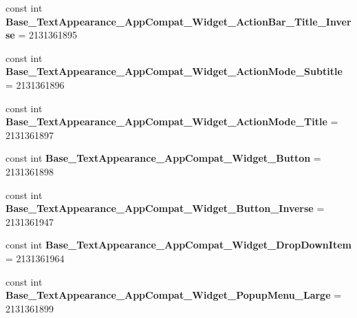 \begin{DoxyCompactItemize}
\item 
\mbox{\label{class_pinned_app_1_1_droid_1_1_resource_1_1_style_ab4b9c350aec81147166de4cb13d0f162}} 
const int {\bfseries Base\+\_\+\+Text\+Appearance\+\_\+\+App\+Compat\+\_\+\+Widget\+\_\+\+Action\+Bar\+\_\+\+Title\+\_\+\+Inverse} = 2131361895
\item 
\mbox{\label{class_pinned_app_1_1_droid_1_1_resource_1_1_style_a0a16fe6ad1aec4050391478f69e26975}} 
const int {\bfseries Base\+\_\+\+Text\+Appearance\+\_\+\+App\+Compat\+\_\+\+Widget\+\_\+\+Action\+Mode\+\_\+\+Subtitle} = 2131361896
\item 
\mbox{\label{class_pinned_app_1_1_droid_1_1_resource_1_1_style_a2993ee38fe4b6b37c43182e882158157}} 
const int {\bfseries Base\+\_\+\+Text\+Appearance\+\_\+\+App\+Compat\+\_\+\+Widget\+\_\+\+Action\+Mode\+\_\+\+Title} = 2131361897
\item 
\mbox{\label{class_pinned_app_1_1_droid_1_1_resource_1_1_style_a335f50d27ad31daba1310bfe34e7cabf}} 
const int {\bfseries Base\+\_\+\+Text\+Appearance\+\_\+\+App\+Compat\+\_\+\+Widget\+\_\+\+Button} = 2131361898
\item 
\mbox{\label{class_pinned_app_1_1_droid_1_1_resource_1_1_style_a932411f98e5dd8f65d8dc3a8deb349fc}} 
const int {\bfseries Base\+\_\+\+Text\+Appearance\+\_\+\+App\+Compat\+\_\+\+Widget\+\_\+\+Button\+\_\+\+Inverse} = 2131361947
\item 
\mbox{\label{class_pinned_app_1_1_droid_1_1_resource_1_1_style_a9151e604c34523e4ce0a316286642bf6}} 
const int {\bfseries Base\+\_\+\+Text\+Appearance\+\_\+\+App\+Compat\+\_\+\+Widget\+\_\+\+Drop\+Down\+Item} = 2131361964
\item 
\mbox{\label{class_pinned_app_1_1_droid_1_1_resource_1_1_style_aee4183b377daf52298446b23ac865d80}} 
const int {\bfseries Base\+\_\+\+Text\+Appearance\+\_\+\+App\+Compat\+\_\+\+Widget\+\_\+\+Popup\+Menu\+\_\+\+Large} = 2131361899

\end{DoxyCompactItemize}
